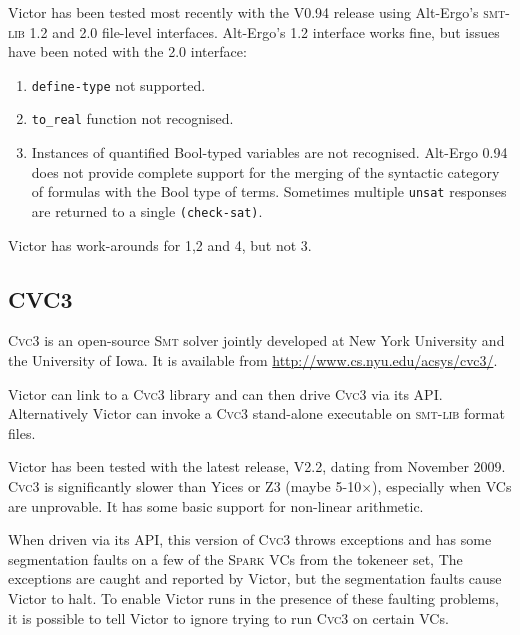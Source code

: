 \documentclass[12pt,fleqn]{article}
\newcommand{\spark}{\textsc{Spark}}
\newcommand{\cvcthree}{\textsc{Cvc}3}
\newcommand{\zthree}{\textsc{Z}3}
\newcommand{\yices}{Yices}
\newcommand{\smt}{\textsc{Smt}}
\newcommand{\smtlib}{\textsc{smt-lib}}
\begin{document}
Victor has been tested most recently with the V0.94 release using
Alt-Ergo's \smtlib{} 1.2 and 2.0 file-level interfaces.  Alt-Ergo's
1.2 interface works fine, but issues have been noted with the 2.0
interface:
\begin{enumerate}
\item \texttt{define-type} not supported.
\item \texttt{to\_real} function not recognised.
\item Instances of quantified Bool-typed variables are 
  not recognised.  Alt-Ergo 0.94 does not provide complete support
  for the merging of the syntactic category of formulas with the Bool
  type of terms.
  Sometimes multiple \texttt{unsat} responses are returned to a
  single \texttt{(check-sat)}.
\end{enumerate}
Victor has work-arounds for 1,2 and 4, but not 3.




\subsection{CVC3}

\cvcthree{} is an open-source \smt{} solver jointly developed at New
York University and the University of Iowa.  It is available from
\url{http://www.cs.nyu.edu/acsys/cvc3/}.

Victor can link to a \cvcthree{} library and can then drive
\cvcthree{} via its API.  Alternatively Victor can invoke a
\cvcthree{} stand-alone executable on \smtlib{} format files.

Victor has been tested with the latest release, V2.2, dating from
November 2009.  
%
%
\cvcthree{} is significantly slower than \yices{} or \zthree{} (maybe
5-10$\times$), especially when VCs are unprovable. 
%
It has some basic support for non-linear arithmetic.

When driven via its API, this version of \cvcthree{} throws exceptions
and has some segmentation faults on a few of the \spark{} VCs from the
tokeneer set,
%
The exceptions are caught and reported by Victor, but 
%
the segmentation faults cause Victor to halt.  To enable Victor runs
in the presence of these faulting problems, it is possible to tell
Victor to ignore trying to run \cvcthree{} on certain VCs.  
\end{document}
